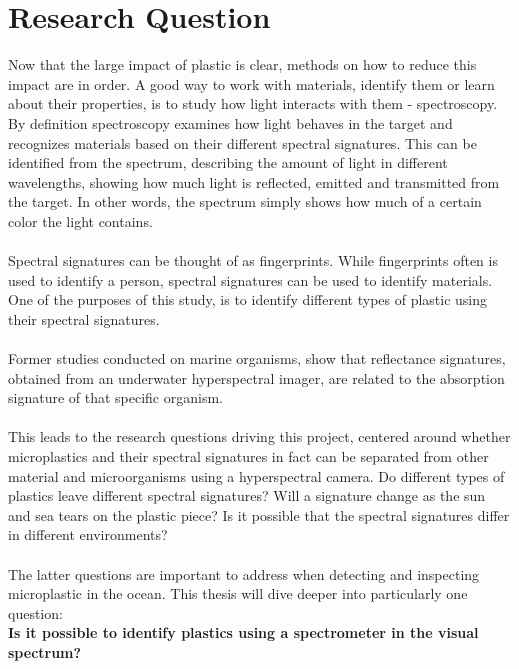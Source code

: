 \section{Research Question}
Now that the large impact of plastic is clear, methods on how to reduce this impact are in order. A good way to work with materials, identify them or learn about their properties, is to study how light interacts with them - spectroscopy. By definition spectroscopy examines how light behaves in the target and recognizes materials based on their different spectral signatures. This can be identified from the spectrum, describing the amount of light in different wavelengths, showing how much light is reflected, emitted and transmitted from the target. In other words, the spectrum simply shows how much of a certain color the light contains. 
\\\\
Spectral signatures can be thought of as fingerprints. While fingerprints often is used to identify a person, spectral signatures can be used to identify materials. One of the purposes of this study, is to identify different types of plastic using their spectral signatures. %
\\\\
Former studies conducted on marine organisms, show that reflectance signatures, obtained from an underwater hyperspectral imager, are related to the absorption signature of that specific organism. \cite{pettersen_johnsen_bruheim_andreassen_2013} %
\\\\
This leads to the research questions driving this project, centered around whether microplastics and their spectral signatures in fact can be separated from other material and microorganisms using a hyperspectral camera. Do different types of plastics leave different spectral signatures? Will a signature change as the sun and sea tears on the plastic piece? Is it possible that the spectral signatures differ in different environments?
\\\\
The latter questions are important to address when detecting and inspecting microplastic in the ocean. This thesis will dive deeper into particularly one question:\\ \textbf{Is it possible to identify plastics using a spectrometer in the visual spectrum?}

